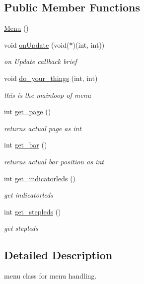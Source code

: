 \subsection*{Public Member Functions}
\begin{DoxyCompactItemize}
\item 
\hyperlink{classMenu_ad466dd83355124a6ed958430450bfe94}{Menu} ()
\item 
void \hyperlink{classMenu_af53cd78e872567d7b3261e76212bf256}{on\-Update} (void($\ast$)(int, int))
\begin{DoxyCompactList}\small\item\em on Update callback brief \end{DoxyCompactList}\item 
void \hyperlink{classMenu_aeb4138d9a42e3db932513b3880ff504c}{do\-\_\-your\-\_\-things} (int, int)
\begin{DoxyCompactList}\small\item\em this is the mainloop of menu \end{DoxyCompactList}\item 
int \hyperlink{classMenu_a4a6d32b0f1500846c567097408b7483b}{get\-\_\-page} ()
\begin{DoxyCompactList}\small\item\em returns actual page as int \end{DoxyCompactList}\item 
int \hyperlink{classMenu_ae0bb7c76d8f80158b8b793e50b0318c8}{get\-\_\-bar} ()
\begin{DoxyCompactList}\small\item\em returns actual bar position as int \end{DoxyCompactList}\item 
int \hyperlink{classMenu_aa0544dfad9c760bad1d16e6e7b31f3a7}{get\-\_\-indicatorleds} ()
\begin{DoxyCompactList}\small\item\em get indicatorleds \end{DoxyCompactList}\item 
int \hyperlink{classMenu_ae25a2b8c34b6e36f0e6fb0d05825c750}{get\-\_\-stepleds} ()
\begin{DoxyCompactList}\small\item\em get stepleds \end{DoxyCompactList}\end{DoxyCompactItemize}


\subsection{Detailed Description}
menu class for menu handling. 

